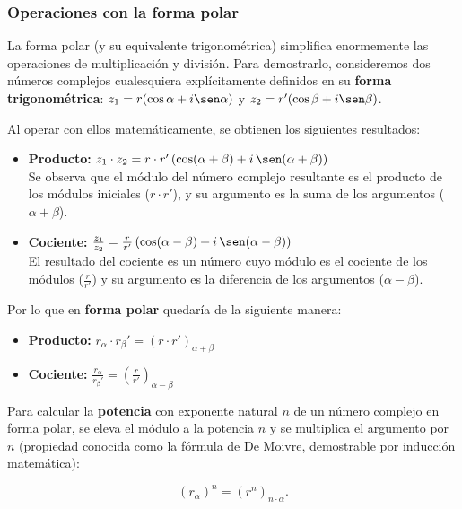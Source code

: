 \subsubsection*{Operaciones con la forma polar}

La forma polar (y su equivalente trigonométrica) simplifica enormemente las operaciones de multiplicación y división. Para demostrarlo, consideremos dos números complejos cualesquiera explícitamente definidos en su \textbf{forma trigonométrica}: $z_1 = r (\cos \alpha + i \sen \alpha)$ y $z_2 = r' (\cos \beta + i \sen \beta)$.

Al operar con ellos matemáticamente, se obtienen los siguientes resultados:

\begin{itemize}
    \item \textbf{Producto:} $z_1 \cdot z_2 = r \cdot r' \, (\cos(\alpha + \beta) + i \, \sen(\alpha + \beta))$\\
          Se observa que el módulo del número complejo resultante es el producto de los módulos iniciales ($r \cdot r'$), y su argumento es la suma de los argumentos ($\alpha + \beta$).

    \item \textbf{Cociente:} $\frac{z_1}{z_2} = \frac{r}{r'} \, (\cos(\alpha - \beta) + i \, \sen(\alpha - \beta))$\\
          El resultado del cociente es un número cuyo módulo es el cociente de los módulos ($\frac{r}{r'}$) y su argumento es la diferencia de los argumentos ($\alpha - \beta$).
\end{itemize}

Por lo que en \textbf{forma polar} quedaría de la siguiente manera:

\begin{itemize}
    \item \textbf{Producto:} $r_\alpha \cdot r_\beta' = (r \cdot r')_{\alpha+\beta}$
    \item \textbf{Cociente:} $\frac{r_\alpha}{r_\beta'} = \left(\frac{r}{r'}\right)_{\alpha - \beta}$
\end{itemize}

Para calcular la \textbf{potencia} con exponente natural $n$ de un número complejo en forma polar, se eleva el módulo a la potencia $n$ y se multiplica el argumento por $n$ (propiedad conocida como la fórmula de De Moivre, demostrable por inducción matemática):

\[
    \left( r_\alpha \right)^n = \left( r^n \right)_{n \cdot \alpha}.
\]

